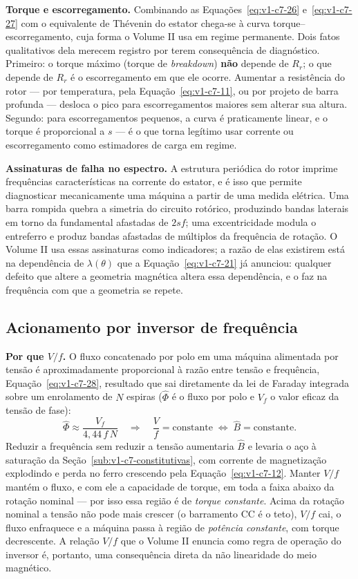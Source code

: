 \documentclass[12pt,a4paper]{article}
\numberwithin{equation}{section}
\numberwithin{table}{section}
\numberwithin{figure}{section}
\begin{document}
\textbf{Torque e escorregamento.} Combinando as
Equações~\eqref{eq:v1-c7-26} e~\eqref{eq:v1-c7-27} com o equivalente de
Thévenin do estator chega-se à curva torque--escorregamento, cuja forma o
Volume II usa em regime permanente. Dois fatos qualitativos dela merecem
registro por terem consequência de diagnóstico. Primeiro: o torque máximo
(torque de \emph{breakdown}) \textbf{não} depende de $R_r$; o que depende de
$R_r$ é o escorregamento em que ele ocorre. Aumentar a resistência do rotor
--- por temperatura, pela Equação~\eqref{eq:v1-c7-11}, ou por projeto de barra
profunda --- desloca o pico para escorregamentos maiores sem alterar sua
altura. Segundo: para escorregamentos pequenos, a curva é praticamente linear,
e o torque é proporcional a $s$ --- é o que torna legítimo usar corrente ou
escorregamento como estimadores de carga em regime.

\textbf{Assinaturas de falha no espectro.} A estrutura periódica do rotor
imprime frequências características na corrente do estator, e é isso que
permite diagnosticar mecanicamente uma máquina a partir de uma medida elétrica.
Uma barra rompida quebra a simetria do circuito rotórico, produzindo bandas
laterais em torno da fundamental afastadas de $2sf$; uma excentricidade
modula o entreferro e produz bandas afastadas de múltiplos da frequência de
rotação. O Volume II usa essas assinaturas como indicadores; a razão de elas
existirem está na dependência de $\lambda(\theta)$ que a
Equação~\eqref{eq:v1-c7-21} já anunciou: qualquer defeito que altere a
geometria magnética altera essa dependência, e o faz na frequência com que a
geometria se repete.

\subsection{Acionamento por inversor de frequência}\label{sub:v1-c7-inversor}

\textbf{Por que $V/f$.} O fluxo concatenado por polo em uma máquina alimentada
por tensão é aproximadamente proporcional à razão entre tensão e frequência,
Equação~\eqref{eq:v1-c7-28}, resultado que sai diretamente da lei de Faraday
integrada sobre um enrolamento de $N$ espiras ($\hat{\Phi}$ é o fluxo por
polo e $V_f$ o valor eficaz da tensão de fase):
\begin{equation}\label{eq:v1-c7-28}
\hat{\Phi} \approx \frac{V_{f}}{4{,}44\,f\,N}
\quad\Longrightarrow\quad
\frac{V}{f} = \text{constante} \;\Leftrightarrow\; \hat{B} = \text{constante} .
\end{equation}
Reduzir a frequência sem reduzir a tensão aumentaria $\hat{B}$ e levaria o aço
à saturação da Seção~\ref{sub:v1-c7-constitutivas}, com corrente de
magnetização explodindo e perda no ferro crescendo pela
Equação~\eqref{eq:v1-c7-12}. Manter $V/f$ mantém o fluxo, e com ele a
capacidade de torque, em toda a faixa abaixo da rotação nominal --- por isso
essa região é de \emph{torque constante}. Acima da rotação nominal a tensão não
pode mais crescer (o barramento CC é o teto), $V/f$ cai, o fluxo enfraquece e a
máquina passa à região de \emph{potência constante}, com torque decrescente.
A relação $V/f$ que o Volume II enuncia como regra de operação do inversor é,
portanto, uma consequência direta da não linearidade do meio magnético.
\end{document}
